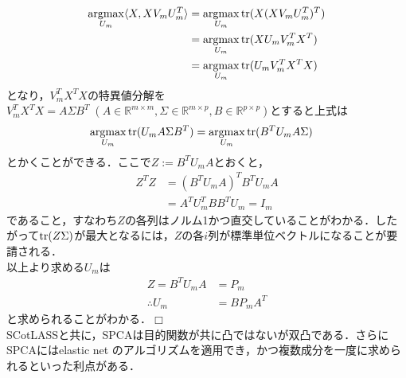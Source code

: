 \documentclass{jsarticle}
\theoremstyle{definition}
\theoremstyle{mystyle} %
\newcommand{\argmax}{\mathop{\rm argmax}\limits}
\def\qed{\hfill$\Box$}
\begin{document}
\begin{equation}
\begin{split}
\argmax_{U_m}\langle X, XV_mU_m^T \rangle&=\argmax_{U_m}{\rm tr}(X(XV_mU_m^T )^T)\\
&=\argmax_{U_m}{\rm tr}(XU_m V_m^T X^T)\\
&=\argmax_{U_m}{\rm tr}(U_m V_m^T X^TX)
\end{split}
\end{equation}
となり，$V_m^TX^TX$の特異値分解を$V_m^TX^TX=A\Sigma B^T\; (A\in\mathbb{R}^{m\times m},\Sigma \in\mathbb{R}^{m\times p},B\in\mathbb{R}^{p\times p})$とすると上式は
\begin{align*}
\argmax_{U_m}{\rm tr}( U_m A\Sigma B^T)&=\argmax_{U_m}{\rm tr}(B^TU_m A\Sigma)
\end{align*}
とかくことができる．ここで$Z:=B^TU_m A$とおくと，
\begin{align*}
Z^TZ &= (B^TU_m A)^TB^TU_m A\\
&=A^TU_m^TBB^TU_m =I_{m}
\end{align*}
であること，すなわち$Z$の各列はノルム1かつ直交していることがわかる．したがって${\rm tr}(Z\Sigma)$が最大となるには，$Z$の各$i$列が標準単位ベクトルになることが要請される．\\

以上より求める$U_m$は
\begin{align*}
Z = B^TU_m A&=P_m\\
\therefore U_m &= B P_m A^T
\end{align*}
と求められることがわかる．\qed\\



SCotLASSと共に，SPCAは目的関数が共に凸ではないが双凸である．さらにSPCAにはelastic net のアルゴリズムを適用でき，かつ複数成分を一度に求められるといった利点がある．
\end{document}
